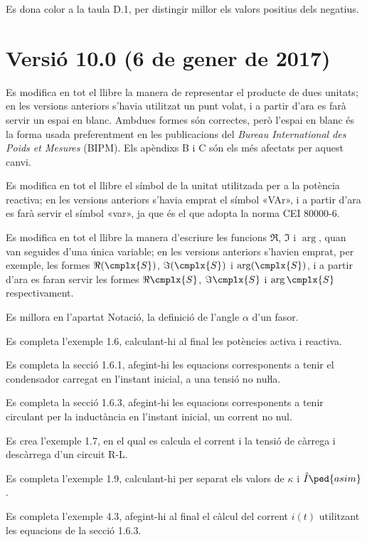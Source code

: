 Es dona color a la taula D.1, per  distingir millor els valors positius dels negatius.

\section*{Versió 10.0 (6 de gener de 2017)}

Es modifica en tot el llibre la manera de representar el producte de dues unitats; en les versions anteriors s'havia utilitzat un punt volat, i a partir d'ara es farà servir un espai en blanc. Ambdues formes són correctes, però l'espai en blanc és la forma usada preferentment en les publicacions del  \textit{Bureau International des Poids et Mesures} (BIPM). Els apèndixs B i C són els més afectats per aquest canvi.

Es modifica en tot el llibre el símbol de la unitat  utilitzada per a la potència reactiva; en les versions anteriors s'havia emprat el símbol «VAr», i a partir d'ara es farà servir el símbol «var», ja que és el que adopta la norma CEI 80000-6.

Es modifica en tot el llibre la manera d'escriure les funcions $\Re$, $\Im$ i $\arg$, quan van seguides d'una única variable; en les versions anteriors s'havien emprat, per exemple, les formes $\Re(\cmplx{S})$, $\Im(\cmplx{S})$ i $\arg(\cmplx{S})$, i a partir d'ara es faran servir les formes $\Re\cmplx{S}$, $\Im\cmplx{S}$ i $\arg\cmplx{S}$ respectivament.


Es millora en l’apartat Notació, la definició de l’angle $\alpha$ d’un fasor.


Es completa l'exemple 1.6, calculant-hi al final les potències activa i reactiva.

Es completa la secció 1.6.1, afegint-hi les equacions corresponents a tenir el condensador carregat en l'instant inicial, a una tensió no nuŀla.

Es completa la secció 1.6.3, afegint-hi les equacions corresponents a tenir circulant per la inductància en l'instant  inicial, un corrent no nul.

Es crea l'exemple 1.7, en el qual es calcula el corrent i la tensió de càrrega i descàrrega d'un circuit R-L.

Es completa l'exemple 1.9, calculant-hi per separat els valors de $\kappa$ i $\hat{I}\ped{asim}$.


Es completa l'exemple 4.3, afegint-hi al final el càlcul del corrent $i(t)$ utilitzant les equacions de la secció 1.6.3.

